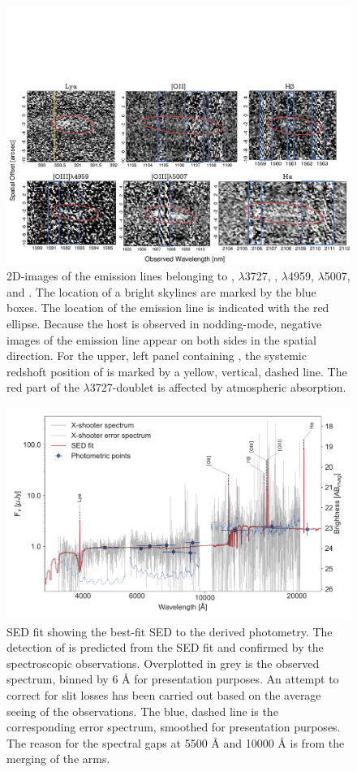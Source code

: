 \documentclass{aa}    %
\begin{document}
\begin{figure}
	\centering
	\includegraphics[width=18cm]{figures/grid.pdf}
	\caption{2D-images of the emission lines belonging to \lya, \oii$\lambda$3727, \hb, \oiii$\lambda$4959, \oiii$\lambda$5007, and \ha. The location of a bright skylines are marked by the blue boxes. The location of the emission line is indicated with the red ellipse. Because the host is observed in nodding-mode, negative images of the emission line appear on both sides in the spatial direction. For the upper, left panel containing \lya, the systemic redshoft position of \lya is marked by a yellow, vertical, dashed line. The red part of the \oii$\lambda$3727-doublet is affected by atmospheric absorption.}
	\label{fig:line}
\end{figure}


\begin{figure}
	\centering
	\includegraphics[width=16cm]{figures/SEDspecphot.pdf}
	\caption{SED fit showing the best-fit SED to the derived photometry. The detection of \lya{}  is predicted from the SED fit and confirmed by the spectroscopic observations. Overplotted in grey is the observed spectrum, binned by 6 \AA{} for presentation purposes. An attempt to correct for slit losses has been carried out based on the average seeing of the observations. The blue, dashed line is the corresponding error spectrum, smoothed for presentation purposes. The reason for the spectral gaps at 5500 \AA{} and 10000 \AA{} is from the merging of the arms.}
	\label{fig:SED}
\end{figure}
\end{document}
